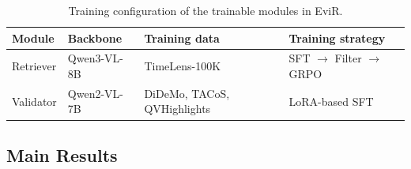 \begin{table}[!htbp]
\caption{Training configuration of the trainable modules in EviR.}
\label{tab:module_training}
\centering
\scriptsize
\setlength{\tabcolsep}{4pt}
\begin{tabular}{llll}
\hline
Module & Backbone & Training data & Training strategy \\
\hline
Retriever & Qwen3-VL-8B & TimeLens-100K & SFT $\rightarrow$ Filter $\rightarrow$ GRPO \\
Validator & Qwen2-VL-7B & DiDeMo, TACoS, QVHighlights & LoRA-based SFT \\
\hline
\end{tabular}
\end{table}
\subsection{Main Results}
\label{sec:main_results}

